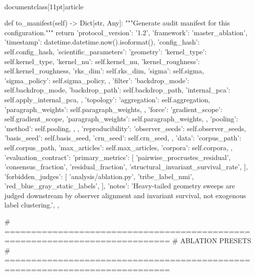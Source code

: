 \\documentclass[11pt]{article}
\begin{document}
\begin{CodeBlock}
    def to_manifest(self) -> Dict[str, Any]:
        """Generate audit manifest for this configuration."""
        return {
            'protocol_version': '1.2',
            'framework': 'master_ablation',
            'timestamp': datetime.datetime.now().isoformat(),
            'config_hash': self.config_hash,
            'scientific_parameters': {
                'geometry': {
                    'kernel_type': self.kernel_type,
                    'kernel_nu': self.kernel_nu,
                    'kernel_roughness': self.kernel_roughness,
                    'rks_dim': self.rks_dim,
                    'sigma': self.sigma,
                    'sigma_policy': self.sigma_policy,
                },
                'filter': {
                    'backdrop_mode': self.backdrop_mode,
                    'backdrop_path': self.backdrop_path,
                    'internal_pca': self.apply_internal_pca,
                },
                'topology': {
                    'aggregation': self.aggregation,
                    'paragraph_weights': self.paragraph_weights,
                },
                'force': {
                    'gradient_scope': self.gradient_scope,
                    'paragraph_weights': self.paragraph_weights,
                },
                'pooling': {
                    'method': self.pooling,
                },
            },
            'reproducibility': {
                'observer_seeds': self.observer_seeds,
                'basis_seed': self.basis_seed,
                'crn_seed': self.crn_seed,
            },
            'data': {
                'corpus_path': self.corpus_path,
                'max_articles': self.max_articles,
                'corpora': self.corpora,
            },
            'evaluation_contract': {
                'primary_metrics': [
                    'pairwise_procrustes_residual',
                    'consensus_fraction',
                    'residual_fraction',
                    'structural_invariant_survival_rate',
                ],
                'forbidden_judges': [
                    'analysis/ablation.py',
                    'tribe_label_nmi',
                    'red_blue_gray_static_labels',
                ],
                'notes': 'Heavy-tailed geometry sweeps are judged downstream by observer alignment and invariant survival, not exogenous label clustering.',
            },
        }


# =============================================================================
# ABLATION PRESETS
# =============================================================================


\end{CodeBlock}
\end{document}
